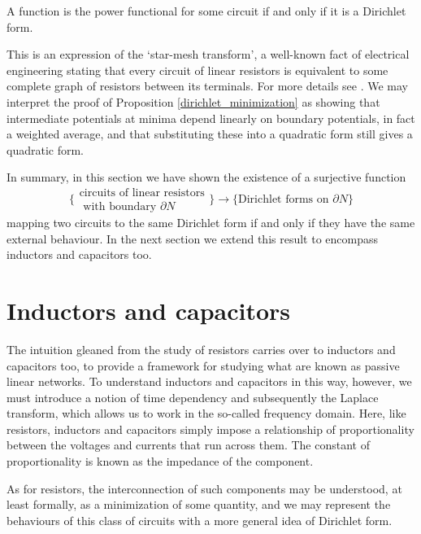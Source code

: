 \begin{proposition}
  A function is the power functional for some circuit if and only if it is a
  Dirichlet form.
\end{proposition}

This is an expression of the `star-mesh transform', a well-known fact of
electrical engineering stating that every circuit of linear resistors is
equivalent to some complete graph of resistors between its terminals. For more
details see \cite{vLO}. We may interpret the proof of Proposition
\ref{dirichlet_minimization} as showing that intermediate potentials at minima
depend linearly on boundary potentials, in fact a weighted average, and that
substituting these into a quadratic form still gives a quadratic form.

\bigskip

In summary, in this section we have shown the existence of a surjective function
\[
  \bigg\{\begin{array}{c} \mbox{circuits of linear resistors} \\ \mbox{ with
    boundary $\partial N$} \end{array} \bigg\} \longrightarrow \bigg\{
    \mbox{Dirichlet forms on $\partial N$}\bigg\}
\]
mapping two circuits to the same Dirichlet form if and only if they have the same
external behaviour.  In the next section we extend this result to encompass
inductors and capacitors too.


\section{Inductors and capacitors} \label{sec:plcs}
The intuition gleaned from the study of resistors carries over to inductors and
capacitors too, to provide a framework for studying what are known as passive
linear networks. To understand inductors and capacitors in this way, however, we
must introduce a notion of time dependency and subsequently the Laplace
transform, which allows us to work in the so-called frequency domain. Here, like
resistors, inductors and capacitors simply impose a relationship of
proportionality between the voltages and currents that run across them. The
constant of proportionality is known as the impedance of the component.

As for resistors, the interconnection of such components may be understood, at
least formally, as a minimization of some quantity, and we may represent the
behaviours of this class of circuits with a more general idea of Dirichlet form.


